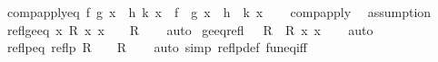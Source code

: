 \begin{isabellebody}
%
\endisadelimproof
\isanewline
{}\isamarkupfalse%
\ comp{\isacharunderscore}{\kern0pt}apply{\isacharunderscore}{\kern0pt}eq{\isacharcolon}{\kern0pt}\ {\isachardoublequoteopen}f\ {\isacharparenleft}{\kern0pt}g\ x{\isacharparenright}{\kern0pt}\ {\isacharequal}{\kern0pt}\ h\ {\isacharparenleft}{\kern0pt}k\ x{\isacharparenright}{\kern0pt}\ {\isasymLongrightarrow}\ {\isacharparenleft}{\kern0pt}f\ {\isasymcirc}\ g{\isacharparenright}{\kern0pt}\ x\ {\isacharequal}{\kern0pt}\ {\isacharparenleft}{\kern0pt}h\ {\isasymcirc}\ k{\isacharparenright}{\kern0pt}\ x{\isachardoublequoteclose}\isanewline
%
\isadelimproof
\ \ %
\endisadelimproof
%
\isatagproof
{}\isamarkupfalse%
\ comp{\isacharunderscore}{\kern0pt}apply\ \isamarkupfalse%
\ assumption%
\endisatagproof
{\isafoldproof}%
%
\isadelimproof
\isanewline
%
\endisadelimproof
\isanewline
{}\isamarkupfalse%
\ refl{\isacharunderscore}{\kern0pt}ge{\isacharunderscore}{\kern0pt}eq{\isacharcolon}{\kern0pt}\ {\isachardoublequoteopen}{\isacharparenleft}{\kern0pt}{\isasymAnd}x{\isachardot}{\kern0pt}\ R\ x\ x{\isacharparenright}{\kern0pt}\ {\isasymLongrightarrow}\ {\isacharparenleft}{\kern0pt}{\isacharequal}{\kern0pt}{\isacharparenright}{\kern0pt}\ {\isasymle}\ R{\isachardoublequoteclose}\isanewline
%
\isadelimproof
\ \ %
\endisadelimproof
%
\isatagproof
{}\isamarkupfalse%
\ auto%
\endisatagproof
{\isafoldproof}%
%
\isadelimproof
\isanewline
%
\endisadelimproof
\isanewline
{}\isamarkupfalse%
\ ge{\isacharunderscore}{\kern0pt}eq{\isacharunderscore}{\kern0pt}refl{\isacharcolon}{\kern0pt}\ {\isachardoublequoteopen}{\isacharparenleft}{\kern0pt}{\isacharequal}{\kern0pt}{\isacharparenright}{\kern0pt}\ {\isasymle}\ R\ {\isasymLongrightarrow}\ R\ x\ x{\isachardoublequoteclose}\isanewline
%
\isadelimproof
\ \ %
\endisadelimproof
%
\isatagproof
{}\isamarkupfalse%
\ auto%
\endisatagproof
{\isafoldproof}%
%
\isadelimproof
\isanewline
%
\endisadelimproof
\isanewline
{}\isamarkupfalse%
\ reflp{\isacharunderscore}{\kern0pt}eq{\isacharcolon}{\kern0pt}\ {\isachardoublequoteopen}reflp\ R\ {\isacharequal}{\kern0pt}\ {\isacharparenleft}{\kern0pt}{\isacharparenleft}{\kern0pt}{\isacharequal}{\kern0pt}{\isacharparenright}{\kern0pt}\ {\isasymle}\ R{\isacharparenright}{\kern0pt}{\isachardoublequoteclose}\isanewline
%
\isadelimproof
\ \ %
\endisadelimproof
%
\isatagproof
{}\isamarkupfalse%
\ {\isacharparenleft}{\kern0pt}auto\ simp{\isacharcolon}{\kern0pt}\ reflp{\isacharunderscore}{\kern0pt}def\ fun{\isacharunderscore}{\kern0pt}eq{\isacharunderscore}{\kern0pt}iff{\isacharparenright}{\kern0pt}%

\end{isabellebody}

